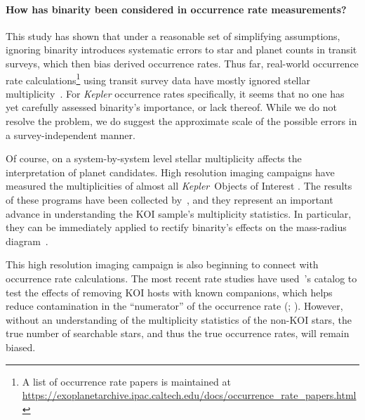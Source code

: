 \documentclass[12pt,modern]{aastex61}
\begin{document}
\paragraph{How has binarity been considered in occurrence rate measurements?}
This study has shown that under a reasonable set of simplifying assumptions, 
ignoring binarity introduces systematic errors to star and planet counts in 
transit surveys, which then bias derived occurrence rates.
Thus far, real-world occurrence rate calculations\footnote{
    A list of occurrence rate papers is maintained at 
    \url{https://exoplanetarchive.ipac.caltech.edu/docs/occurrence_rate_papers.html}
} using transit survey data have mostly ignored stellar 
multiplicity~\citep[\textit{e.g.},][]{howard_planet_2012,fressin_false_2013,foreman-mackey_exoplanet_2014,dressing_occurrence_2015,burke_terrestrial_2015}.
For {\it Kepler} occurrence rates specifically, 
it seems that no one has yet carefully assessed binarity's importance, or lack 
thereof.
While we do not resolve the problem, we do suggest the approximate scale of 
the possible errors in a survey-independent manner.

Of course, on a system-by-system level stellar multiplicity affects the 
interpretation of planet candidates. High resolution imaging 
campaigns have measured the multiplicities of almost all {\it Kepler}\ Objects 
of Interest 
\citep{howell_speckle_2011,adams_adaptive_2012,adams_adaptive_2013,horch_observations_2012,
    horch_most_2014,lillo-box_multiplicity_2012,lillo-box_high-resolution_2014,dressing_adaptive_2014,
    law_robotic_2014,cartier_revision_2015,everett_high-resolution_2015,gilliland_hubble_2015,
    wang_influence_2015,wang_influence_2015-1,baranec_robo-ao_2016,ziegler_robo-ao_2017}.
The results of these programs have been collected 
by~\citet{furlan_kepler_2017}, and they represent an important advance in 
understanding the KOI 
sample's multiplicity statistics.
In particular, they can be immediately applied to rectify binarity's effects 
on the mass-radius diagram~\citep{furlan_densities_2017}.

This high resolution imaging campaign is also beginning to connect with
occurrence rate calculations.
The most recent rate studies have used~\citet{furlan_kepler_2017}'s 
catalog to test the effects of removing KOI hosts with known companions, which 
helps reduce contamination in the ``numerator'' of 
the occurrence rate (\citealt{fulton_california-_2017}; 
\citealt{petigura_CKS_2017}).
However, without an understanding of the multiplicity statistics of the 
non-KOI stars, the true number of searchable stars, and thus the true 
occurrence rates, will remain biased.
\end{document}
